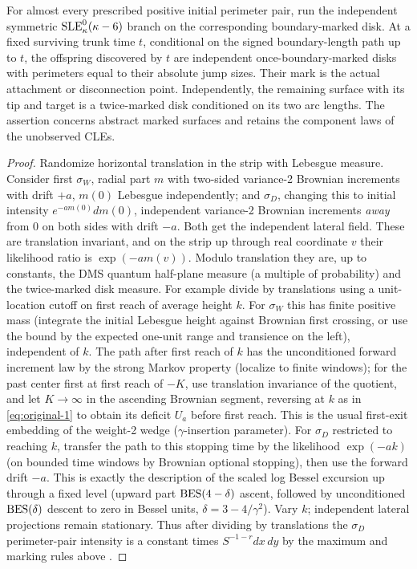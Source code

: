 \begin{proposition}\label{proxy:marked-factorization}
For almost every prescribed positive initial perimeter pair, run the independent symmetric $\mathrm{SLE}^0_\kappa(\kappa-6)$ branch on the corresponding boundary-marked disk.  At a fixed surviving trunk time $t$, conditional on the signed boundary-length path up to $t$, the offspring discovered by $t$ are independent once-boundary-marked disks with perimeters equal to their absolute jump sizes.  Their mark is the actual attachment or disconnection point.  Independently, the remaining surface with its tip and target is a twice-marked disk conditioned on its two arc lengths.  The assertion concerns abstract marked surfaces and retains the component laws of the unobserved CLEs.
\end{proposition}\begin{proof}


Randomize horizontal translation in the strip with Lebesgue measure.
Consider first \(\sigma_W\), radial part \(m\) with two-sided variance-2 Brownian increments with drift \(+a\), \(m(0)\) Lebesgue independently; and \(\sigma_D\), changing this to initial intensity \(e^{-a m(0)}dm(0)\), independent variance-2 Brownian increments \emph{away} from 0 on both sides with drift \(-a\).
Both get the independent lateral field.
These are translation invariant, and on the strip up through real coordinate \(v\) their likelihood ratio is
\(\exp(-a m(v))\).
Modulo translation they are, up to constants, the DMS quantum half-plane measure (a multiple of probability) and the twice-marked disk measure.
For example divide by translations using a unit-location cutoff on first reach of average height \(k\).
For \(\sigma_W\) this has finite positive mass (integrate the initial Lebesgue height against Brownian first crossing, or use the bound by the expected one-unit range and transience on the left), independent of \(k\).
The path after first reach of \(k\) has the unconditioned forward increment law by the strong Markov property (localize to finite windows); for the past center first at first reach of \(-K\), use translation invariance of the quotient, and let \(K\to\infty\) in the ascending Brownian segment, reversing at \(k\) as in \eqref{eq:original-1} to obtain its deficit \(U_a\) before first reach.
This is the usual first-exit embedding of the weight-2 wedge (\(\gamma\)-insertion parameter).
For \(\sigma_D\) restricted to reaching \(k\), transfer the path to this stopping time by the likelihood \(\exp(-ak)\) (on bounded time windows by Brownian optional stopping), then use the forward drift \(-a\).
This is exactly the description of the scaled log Bessel excursion up through a fixed level (upward part \({\rm BES}(4-\delta)\) ascent, followed by unconditioned \({\rm BES}(\delta)\) descent to zero in Bessel units, \(\delta=3-4/\gamma^2\)).
Vary \(k\); independent lateral projections remain stationary.
Thus after dividing by translations the \(\sigma_D\) perimeter-pair intensity is a constant times \(S^{-1-r}dx\,dy\) by the maximum and marking rules above \citep{DMS}.


\end{proof}
